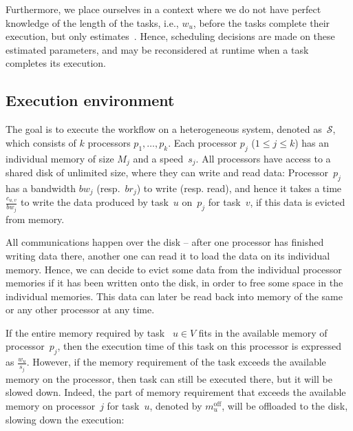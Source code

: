 \documentclass[conference]{IEEEtran}
\newcommand{\cluster}{\,\mathcal{S}}
\newcommand{\bw}{bw}
\newcommand{\br}{br}
\newcommand{\Moff}[1]{m^{\text{off}}_{#1}}
\newcommand{\skug}[1]{{\color{blue}[SK: #1]}}
\newcommand{\AB}[1]{{\color{purple}[AB: #1]}}
\begin{document}
Furthermore, we place ourselves in a context where we do not have perfect knowledge
of the length of the tasks, i.e., $w_u$, %
before the tasks complete their execution,
but only estimates~\cite{rahman2013,GARG2015256}.  
Hence, scheduling decisions are made on these estimated parameters, and
may be reconsidered at runtime when a task completes its execution. 

    \subsection{Execution environment}
    \label{sec.mod.plat}

The goal is to execute the workflow on a heterogeneous system, denoted as $\cluster$, which
consists of $k$ processors $p_1, \dots, p_k$.
Each processor $p_j$ ($1 \leq j \leq k$) has an individual memory of size $M_j$ and a speed~$s_j$.
All processors have access to a shared disk of unlimited size, where they can write
and read data: Processor~$p_j$ has a bandwidth $\bw_j$ (resp.~$\br_j$) to write  (resp. read),
and hence it takes a time $\frac{c_{u,v}}{bw_j}$ to write the data produced by task~$u$
on~$p_j$ for task~$v$, 
if this data is evicted from memory. 

All communications happen over the disk -- after one processor has finished writing data there, another one can read
it to load the data on its individual memory. 
Hence, we can decide to evict some data from the individual processor memories if it has been 
written onto the disk, 
in order to free some space in the individual memories.
This data can later be read back into memory of the same or any other processor at any time.

If the entire memory required by  task ~$u\in V$ fits in the available memory of processor~$p_j$,
    then the execution time of this task on this processor is expressed as $\frac{w_u}{s_j}$.
However, if the memory requirement of the task exceeds the available memory on the processor, 
then task can still be executed there, but it will be slowed down. Indeed, 
the part of memory requirement that exceeds the available memory on processor~$j$ for task~$u$, 
denoted by $\Moff{u}$, %
will be offloaded to the disk, slowing down the execution:
\end{document}
